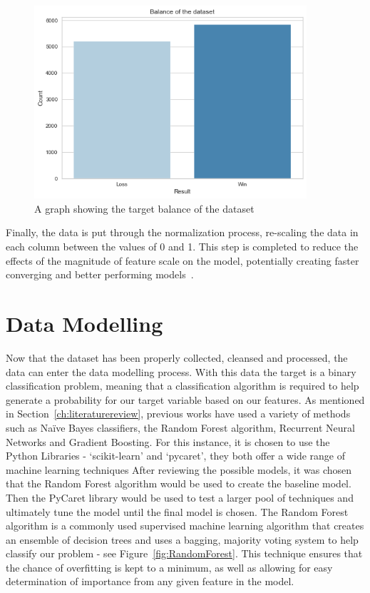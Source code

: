 \begin{figure}[h!]
    \centering
    \includegraphics[width=0.9\textwidth]{figures/DataBalance}
    \caption{A graph showing the target balance of the dataset}
    \label{fig:DataBalance}
\end{figure}

Finally, the data is put through the normalization process, re-scaling the data in each column between the values of 0 and 1.
This step is completed to reduce the effects of the magnitude of feature scale on the model, potentially creating faster converging and better performing models~\citep{normalizePython}.

\section{Data Modelling}\label{sec:Data Modelling}
Now that the dataset has been properly collected, cleansed and processed, the data can enter the data modelling process.
With this data the target is a binary classification problem, meaning that a classification algorithm is required to help generate a probability for our target variable based on our features.
As mentioned in Section~\ref{ch:literaturereview}, previous works have used a variety of methods such as Naïve Bayes classifiers, the Random Forest algorithm, Recurrent Neural Networks and Gradient Boosting.
For this instance, it is chosen to use the Python Libraries - `scikit-learn' and `pycaret', they both offer a wide range of machine learning techniques
After reviewing the possible models, it was chosen that the Random Forest algorithm would be used to create the baseline model.
Then the PyCaret library would be used to test a larger pool of techniques and ultimately tune the model until the final model is chosen.
The Random Forest algorithm is a commonly used supervised machine learning algorithm that creates an ensemble of decision trees and uses a bagging, majority voting system to help classify our problem - see Figure~\ref{fig:RandomForest}.
This technique ensures that the chance of overfitting is kept to a minimum, as well as allowing for easy determination of importance from any given feature in the model.

